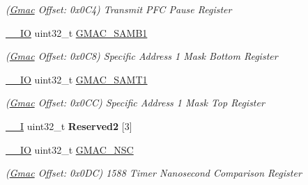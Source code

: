 \begin{DoxyCompactItemize}
\begin{DoxyCompactList}\small\item\em (\mbox{\hyperlink{structGmac}{Gmac}} Offset\+: 0x0\+C4) Transmit P\+FC Pause Register \end{DoxyCompactList}\item 
\mbox{\label{structGmac_aba2e25d38499543abacafb488d949c61}} 
\mbox{\hyperlink{core__cm7_8h_aec43007d9998a0a0e01faede4133d6be}{\+\_\+\+\_\+\+IO}} uint32\+\_\+t \mbox{\hyperlink{structGmac_aba2e25d38499543abacafb488d949c61}{G\+M\+A\+C\+\_\+\+S\+A\+M\+B1}}
\begin{DoxyCompactList}\small\item\em (\mbox{\hyperlink{structGmac}{Gmac}} Offset\+: 0x0\+C8) Specific Address 1 Mask Bottom Register \end{DoxyCompactList}\item 
\mbox{\label{structGmac_a01103f24eb94a57af158be5f792371fa}} 
\mbox{\hyperlink{core__cm7_8h_aec43007d9998a0a0e01faede4133d6be}{\+\_\+\+\_\+\+IO}} uint32\+\_\+t \mbox{\hyperlink{structGmac_a01103f24eb94a57af158be5f792371fa}{G\+M\+A\+C\+\_\+\+S\+A\+M\+T1}}
\begin{DoxyCompactList}\small\item\em (\mbox{\hyperlink{structGmac}{Gmac}} Offset\+: 0x0\+CC) Specific Address 1 Mask Top Register \end{DoxyCompactList}\item 
\mbox{\label{structGmac_a9fe53792125c84a6b0645d989c9b472c}} 
\mbox{\hyperlink{core__cm7_8h_af63697ed9952cc71e1225efe205f6cd3}{\+\_\+\+\_\+I}} uint32\+\_\+t {\bfseries Reserved2} \mbox{[}3\mbox{]}
\item 
\mbox{\label{structGmac_a7c2cac4e4af18cfc5f1afe5554d83e00}} 
\mbox{\hyperlink{core__cm7_8h_aec43007d9998a0a0e01faede4133d6be}{\+\_\+\+\_\+\+IO}} uint32\+\_\+t \mbox{\hyperlink{structGmac_a7c2cac4e4af18cfc5f1afe5554d83e00}{G\+M\+A\+C\+\_\+\+N\+SC}}
\begin{DoxyCompactList}\small\item\em (\mbox{\hyperlink{structGmac}{Gmac}} Offset\+: 0x0\+DC) 1588 Timer Nanosecond Comparison Register \end{DoxyCompactList}\item 
\mbox{\label{structGmac_a3cb87be2383c10f7e32d8adae25f3eae}} 

\end{DoxyCompactItemize}
